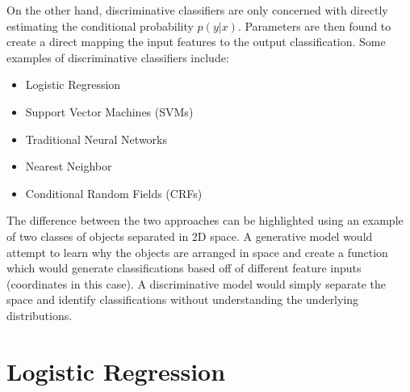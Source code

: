 \documentclass{article}
\begin{document}
On the other hand, discriminative classifiers are only concerned with directly estimating the conditional probability $p(y|x)$. Parameters are then found to create a direct mapping the input features to the output classification. Some examples of discriminative classifiers include:
\begin{itemize}
    \item Logistic Regression
    \item Support Vector Machines (SVMs)
    \item Traditional Neural Networks
    \item Nearest Neighbor
    \item Conditional Random Fields (CRFs)
\end{itemize}

The difference between the two approaches can be highlighted using an example of two classes of objects separated in 2D space. A generative model would attempt to learn why the objects are arranged in space and create a function which would generate classifications based off of different feature inputs (coordinates in this case). A discriminative model would simply separate the space and identify classifications without understanding the underlying distributions. 


\section{Logistic Regression}
\end{document}
